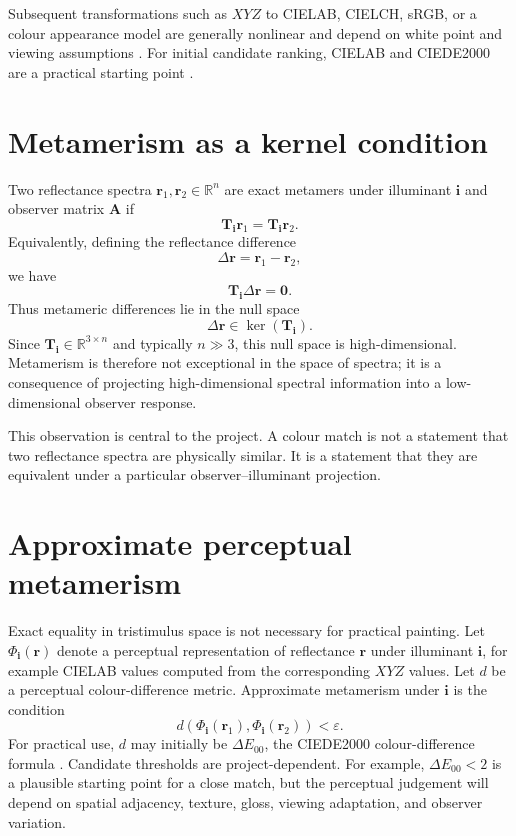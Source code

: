 \documentclass[11pt,a4paper]{article}
\newcommand{\R}{\mathbb{R}}
\newcommand{\vect}[1]{\boldsymbol{#1}}
\newcommand{\mat}[1]{\mathbf{#1}}
\newcommand{\DE}{\Delta E}
\begin{document}
Subsequent transformations such as $XYZ$ to CIELAB, CIELCH, sRGB, or a colour appearance model are generally nonlinear and depend on white point and viewing assumptions \citep{Fairchild2013,Hunt2004}. For initial candidate ranking, CIELAB and CIEDE2000 are a practical starting point \citep{CIE1422001,LuoCuiRigg2001,SharmaWuDalal2005}.

\section{Metamerism as a kernel condition}

Two reflectance spectra $\vect{r}_1,\vect{r}_2\in\R^n$ are exact metamers under illuminant $\vect{i}$ and observer matrix $\mat{A}$ if
\begin{equation}
 \mat{T}_{\vect{i}}\vect{r}_1=\mat{T}_{\vect{i}}\vect{r}_2.
\end{equation}
Equivalently, defining the reflectance difference
\begin{equation}
 \Delta\vect{r}=\vect{r}_1-\vect{r}_2,
\end{equation}
we have
\begin{equation}
 \mat{T}_{\vect{i}}\Delta\vect{r}=\vect{0}.
 \label{eq:metamer_kernel}
\end{equation}
Thus metameric differences lie in the null space
\begin{equation}
 \Delta\vect{r}\in\ker(\mat{T}_{\vect{i}}).
\end{equation}
Since $\mat{T}_{\vect{i}}\in\R^{3\times n}$ and typically $n\gg 3$, this null space is high-dimensional. Metamerism is therefore not exceptional in the space of spectra; it is a consequence of projecting high-dimensional spectral information into a low-dimensional observer response.

This observation is central to the project. A colour match is not a statement that two reflectance spectra are physically similar. It is a statement that they are equivalent under a particular observer--illuminant projection.

\section{Approximate perceptual metamerism}

Exact equality in tristimulus space is not necessary for practical painting. Let $\Phi_{\vect{i}}(\vect{r})$ denote a perceptual representation of reflectance $\vect{r}$ under illuminant $\vect{i}$, for example CIELAB values computed from the corresponding $XYZ$ values. Let $d$ be a perceptual colour-difference metric. Approximate metamerism under $\vect{i}$ is the condition
\begin{equation}
 d\!\left(\Phi_{\vect{i}}(\vect{r}_1),\Phi_{\vect{i}}(\vect{r}_2)\right)<\varepsilon.
 \label{eq:approx_metamerism}
\end{equation}
For practical use, $d$ may initially be $\DE_{00}$, the CIEDE2000 colour-difference formula \citep{CIE1422001,LuoCuiRigg2001,SharmaWuDalal2005}. Candidate thresholds are project-dependent. For example, $\DE_{00}<2$ is a plausible starting point for a close match, but the perceptual judgement will depend on spatial adjacency, texture, gloss, viewing adaptation, and observer variation.
\end{document}
